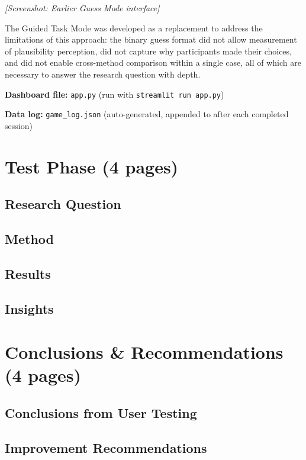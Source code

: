 \documentclass[
  letterpaper,
  DIV=11,
  numbers=noendperiod]{scrartcl}
\begin{document}
\emph{{[}Screenshot: Earlier Guess Mode interface{]}}

The Guided Task Mode was developed as a replacement to address the
limitations of this approach: the binary guess format did not allow
measurement of plausibility perception, did not capture why participants
made their choices, and did not enable cross-method comparison within a
single case, all of which are necessary to answer the research question
with depth.

\textbf{Dashboard file:} \texttt{app.py} (run with
\texttt{streamlit\ run\ app.py})

\textbf{Data log:} \texttt{game\_log.json} (auto-generated, appended to
after each completed session)

\section{Test Phase (4 pages)}\label{test-phase-4-pages}

\subsection{Research Question}\label{research-question-1}

\subsection{Method}\label{method}

\subsection{Results}\label{results}

\subsection{Insights}\label{insights}

\section{Conclusions \& Recommendations (4
pages)}\label{conclusions-recommendations-4-pages}

\subsection{Conclusions from User
Testing}\label{conclusions-from-user-testing}

\subsection{Improvement
Recommendations}\label{improvement-recommendations}
\end{document}
